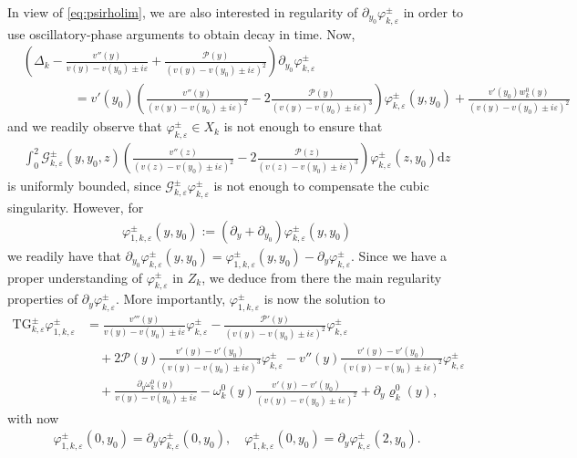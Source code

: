 \documentclass[11pt,reqno]{amsproc}
\theoremstyle{definition}
\numberwithin{equation}{section}
\newcommand{\G}{{\mathcal{G}}}
\renewcommand{\d}{\mathrm{d}}
\newcommand{\ep}{\varepsilon}
\renewcommand{\P}{{\mathcal{P}}}
\begin{document}
In view of \eqref{eq:psirholim}, we are also interested in regularity of $\partial_{y_0}\varphi_{k,\ep}^\pm$ in order to use oscillatory-phase arguments to obtain decay in time. Now,
\begin{align*}
&\left( \Delta_k - \frac{v''(y)}{v(y) - v(y_0)\pm i\ep} + \frac{\P(y)}{(v(y) - v(y_0) \pm i\ep)^2} \right) \partial_{y_0}\varphi_{k,\ep}^\pm \\
&\qquad\qquad= v'(y_0) \left( \frac{v''(y)}{(v(y) - v(y_0)\pm i\ep)^2} -2 \frac{\P(y)}{(v(y) - v(y_0)\pm i\ep)^3}\right) \varphi_{k,\ep}^\pm(y,y_0) + \frac{v'(y_0)w_k^0(y)}{(v(y) - v(y_0) \pm i\ep)^2}
\end{align*}
and we readily observe that $\varphi_{k,\ep}^\pm\in X_k$ is not enough to ensure that
\begin{align*}
\int_0^2 \G_{k,\ep}^\pm(y,y_0,z)  \left( \frac{v''(z)}{(v(z) - v(y_0)\pm i\ep)^2} -2 \frac{\P(z)}{(v(z) - v(y_0)\pm i\ep)^3}\right) \varphi_{k,\ep}^\pm(z,y_0) \d z
\end{align*}
is uniformly bounded, since $\G_{k,\ep}^\pm\varphi_{k,\ep}^\pm$ is not enough to compensate the cubic singularity. However, for 
\begin{align*}
\varphi_{1,k,\ep}^\pm(y,y_0) := \left( \partial_y + \partial_{y_0}\right)\varphi_{k,\ep}^\pm(y,y_0)
\end{align*}
we readily have that $\partial_{y_0}\varphi_{k,\ep}^\pm(y,y_0) = \varphi_{1,k,\ep}^\pm(y,y_0) - \partial_y\varphi_{k,\ep}^\pm$. Since we have a proper understanding of $\varphi_{k,\ep}^\pm$ in $Z_k$, we deduce from there the main regularity properties of $\partial_y\varphi_{k,\ep}^\pm$. More importantly, $\varphi_{1,k,\ep}^\pm$ is now the solution to 
\begin{equation}\label{eq:introTGvarphi1}
\begin{split}
\text{TG}_{k,\ep}^\pm\varphi_{1,k,\ep}^\pm &= \frac{v'''(y)}{v(y) - v(y_0) \pm i\ep}\varphi_{k,\ep}^\pm - \frac{\P'(y)}{(v(y) - v(y_0)\pm i\ep)^2}\varphi_{k,\ep}^\pm \\
&\quad + 2\P(y)\frac{v'(y) - v'(y_0)}{(v(y) - v(y_0) \pm i\ep)^3}\varphi_{k,\ep}^\pm - v''(y) \frac{v'(y)-v'(y_0)}{(v(y) - v(y_0)\pm i\ep)^2} \varphi_{k,\ep}^\pm \\
&\quad + \frac{\partial_y\omega_k^0(y)}{v(y) - v(y_0)\pm i\ep} - \omega_k^0(y)\frac{v'(y) - v'(y_0)}{(v(y) - v(y_0) \pm i\ep)^2} + \partial_y \varrho_k^0(y),
\end{split}
\end{equation}
with now
\begin{align*}
\varphi_{1,k,\ep}^\pm(0,y_0) = \partial_y\varphi_{k,\ep}^\pm(0,y_0), \quad  \varphi_{1,k,\ep}^\pm(0,y_0) = \partial_y\varphi_{k,\ep}^\pm(2,y_0).
\end{align*}
\end{document}
